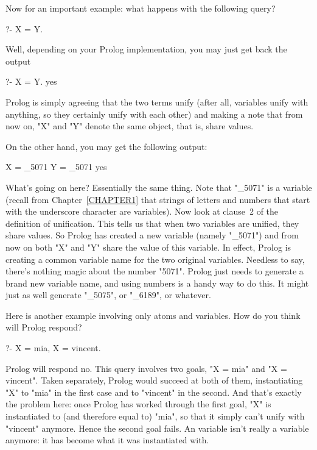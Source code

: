 Now for an important example: what happens with the following query?
\begin{LPNcodedisplay}
?- X = Y.
\end{LPNcodedisplay}
%
Well, depending on your Prolog implementation, you may just get back
the output
\begin{LPNcodedisplay}
?- X = Y.
yes
\end{LPNcodedisplay}
%
Prolog is simply agreeing that the two terms unify (after all,
variables unify with anything, so they certainly unify with each
other) and making a note that from now on, "X" and "Y" denote the same
object, that is, share values.

On the other hand, you may get the following output:
\begin{LPNcodedisplay}
X = _5071
Y = _5071
yes
\end{LPNcodedisplay}
What's going on here?  Essentially the same thing. Note that "\_5071"
is a variable (recall from Chapter~\ref{CHAPTER1} that strings of
letters and numbers that start with the underscore character are
variables).  Now look at clause~2 of the definition of
unification. This tells us that when two variables are unified, they
share values. So Prolog has created a new variable (namely "\_5071")
and from now on both "X" and "Y" share the value of this variable. In
effect, Prolog is creating a common variable name for the two original
variables.  Needless to say, there's nothing magic about the number
"5071".  Prolog just needs to generate a brand new variable name, and
using numbers is a handy way to do this. It might just as well
generate "\_5075", or "\_6189", or whatever.

Here is another example involving only atoms and variables. How do you
think will Prolog respond?
\begin{LPNcodedisplay}
?- X = mia, X = vincent.
\end{LPNcodedisplay}


Prolog will respond no. This query involves two goals, "X = mia" and
"X = vincent". Taken separately, Prolog would succeed at both of them,
instantiating "X" to "mia" in the first case and to "vincent" in the
second. And that's exactly the problem here: once Prolog has worked
through the first goal, "X" is instantiated to (and therefore equal
to) "mia", so that it simply can't unify with "vincent" anymore.
Hence the second goal fails. An  variable isn't
really a variable anymore: it has become what it was instantiated with.


